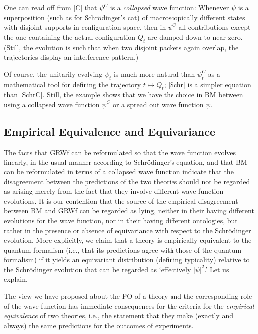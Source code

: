 \documentclass[12pt]{article}
\begin{document}
One can read off from \eqref{C} that $\psi^C$ is a \emph{collapsed} wave function: Whenever $\psi$ is a superposition (such as for Schr\"odinger's cat) of macroscopically different states with disjoint supports in configuration space, then in $\psi^C$ all contributions except the one containing the actual configuration $Q_t$ are damped down to near zero. (Still, the evolution is such that when two disjoint packets again overlap, the trajectories display an interference pattern.)

Of course, the unitarily-evolving $\psi_t$ is much more natural than $\psi_t^C$ as a mathematical tool for defining the trajectory $t\mapsto Q_t$; \eqref{Schr} is a simpler equation than \eqref{SchrC}. Still, the example shows that we have the choice in {\sf BM} between using a collapsed wave function $\psi^C$ or a spread out wave function $\psi$.


\subsection{Empirical Equivalence and Equivariance}
\label{sec:equiv}



The facts that {\sf GRWf} can be reformulated so that the wave function
evolves linearly, in the usual manner according to Schr\"odinger's
equation, and that {\sf BM} can be reformulated in terms of a collapsed
wave function indicate that the disagreement between the predictions of the
two theories should not be regarded as arising merely from the fact that
they involve different wave function evolutions. It is our contention that
the source of the empirical disagreement between {\sf BM} and {\sf GRWf}
can be regarded as lying, neither in their having different evolutions for the wave function,
nor in their having different ontologies, but rather in the presence or
absence of equivariance with respect to the Schr\"odinger evolution. More
explicitly, we claim that a theory is empirically equivalent to the quantum
formalism (i.e., that its predictions agree with those of the quantum
formalism) if it yields an equivariant distribution (defining typicality)
relative to the Schr\"odinger evolution that can be regarded as
`effectively $|\psi|^2$.'  Let us explain.



The view we have proposed about the PO of a theory and the corresponding role of the
wave function has immediate consequences for the criteria for the \emph{empirical
  equivalence} of two theories, i.e., the statement that they make
(exactly and always) the same predictions for the outcomes of experiments.
\end{document}
